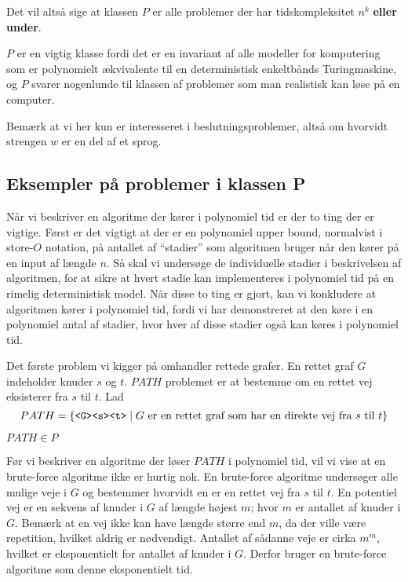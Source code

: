 Det vil altså sige at klassen $P$ er alle problemer der har tidskompleksitet $n^{k}$ \textbf{eller under}.

$P$ er en vigtig klasse fordi det er en invariant af alle modeller for komputering som er polynomielt ækvivalente til en deterministisk enkeltbånds Turingmaskine, og $P$ svarer nogenlunde til klassen af problemer som man realistisk kan løse på en computer.

Bemærk at vi her kun er interesseret i beslutningsproblemer, altså om hvorvidt strengen $w$ er en del af et sprog.

\subsection{Eksempler på problemer i klassen P}%
\label{subsec:examplesinp}

Når vi beskriver en algoritme der kører i polynomiel tid er der to ting der er vigtige. Først er det vigtigt at der er en polynomiel upper bound, normalvist i store-$O$ notation, på antallet af ``stadier'' som algoritmen bruger når den kører på en input af længde $n$. Så skal vi undersøge de individuelle stadier i beskrivelsen af algoritmen, for at sikre at hvert stadie kan implementeres i polynomiel tid på en rimelig deterministisk model. Når disse to ting er gjort, kan vi konkludere at algoritmen kører i polynomiel tid, fordi vi har demonstreret at den køre i en polynomiel antal af stadier, hvor hver af disse stadier også kan køres i polynomiel tid.

Det første problem vi kigger på omhandler rettede grafer. En rettet graf $G$ indeholder knuder $s$ og $t$. $PATH$ problemet er at bestemme om en rettet vej eksisterer fra $s$ til $t$. Lad
\begin{equation*}
	PATH = \{\text{\texttt{<G><s><t>}} \mid G \text{ er en rettet graf som har en direkte vej fra } s \text{ til } t\}
\end{equation*}

\begin{theorem}
	$PATH \in P$
\end{theorem}

Før vi beskriver en algoritme der løser $PATH$ i polynomiel tid, vil vi vise at en brute-force algoritme ikke er hurtig nok. En brute-force algoritme undersøger alle mulige veje i $G$ og bestemmer hvorvidt en er en rettet vej fra $s$ til $t$. En potentiel vej er en sekvens af knuder i $G$ af længde højest $m$; hvor $m$ er antallet af knuder i $G$. Bemærk at en vej ikke kan have længde større end $m$, da der ville være repetition, hvilket aldrig er nødvendigt. Antallet af sådanne veje er cirka $m^{m}$, hvilket er eksponentielt for antallet af knuder i $G$. Derfor bruger en brute-force algoritme som denne eksponentielt tid.

